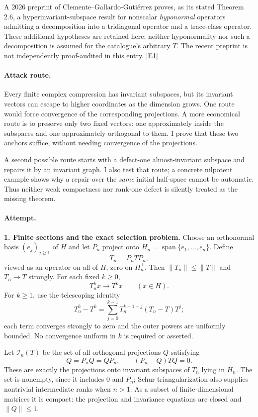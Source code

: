 \documentclass[11pt,a4paper]{article}
\newcommand{\eref}[2]{\hyperlink{extra:#1:#2}{[E#2]}}
\numberwithin{equation}{section}
\begin{document}
A 2026 preprint of Clemente--Gallardo-Guti\'errez proves, as its stated
Theorem 2.6, a hyperinvariant-subspace result for nonscalar \emph{hyponormal}
operators admitting a decomposition into a tridiagonal operator and a
trace-class operator. These additional hypotheses are retained here; neither
hyponormality nor such a decomposition is assumed for the catalogue's
arbitrary $T$. The recent preprint is not independently proof-audited in
this entry. \eref{3034}{1}

\paragraph{Attack route.}
Every finite complex compression has invariant subspaces, but its invariant
vectors can escape to higher coordinates as the dimension grows. One route
would force convergence of the corresponding projections. A more economical
route is to preserve only two fixed vectors: one approximately inside the
subspaces and one approximately orthogonal to them. I prove that these two
anchors suffice, without needing convergence of the projections.

A second possible route starts with a defect-one almost-invariant subspace
and repairs it by an invariant graph. I also test that route; a concrete
nilpotent example shows why a repair over the \emph{same} initial half-space
cannot be automatic. Thus neither weak compactness nor rank-one defect is
silently treated as the missing theorem.

\paragraph{Attempt.}
\textbf{1. Finite sections and the exact selection problem.}
Choose an orthonormal basis $(e_j)_{j\geq1}$ of $H$ and let $P_n$ project onto
$H_n=\operatorname{span}\{e_1,\ldots,e_n\}$. Define
\[
 T_n=P_nTP_n,
\]
viewed as an operator on all of $H$, zero on $H_n^\perp$. Then
$\|T_n\|\leq\|T\|$ and $T_n\to T$ strongly. For each fixed $k\geq0$,
\begin{equation}\label{3034:powers}
 T_n^k x\longrightarrow T^k x\qquad(x\in H).
\end{equation}
For $k\geq1$, use the telescoping identity
\[
 T_n^k-T^k=\sum_{j=0}^{k-1}T_n^{k-1-j}(T_n-T)T^j;
\]
each term converges strongly to zero and the outer powers are uniformly
bounded. No convergence uniform in $k$ is required or asserted.

Let $\mathcal I_n(T)$ be the set of all orthogonal projections $Q$ satisfying
\begin{equation}\label{3034:finite-invariance}
 Q=P_nQ=QP_n,\qquad (P_n-Q)TQ=0.
\end{equation}
These are exactly the projections onto invariant subspaces of $T_n$ lying
in $H_n$. The set is nonempty, since it includes $0$ and $P_n$; Schur
triangularization also supplies nontrivial intermediate ranks when $n>1$.
As a subset of finite-dimensional matrices it is compact: the projection
and invariance equations are closed and $\|Q\|\leq1$.
\end{document}
